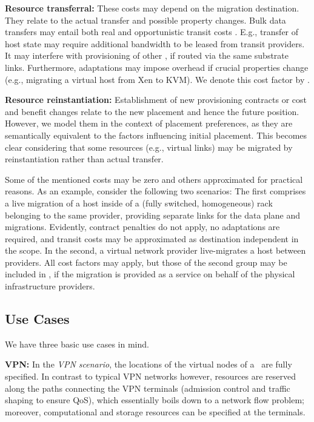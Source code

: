 \documentclass[conference,10pt]{IEEEtran}
\newcommand{\CloudNet}{\text{CloudNet}}
\newcommand{\CloudNets}{\text{CloudNets}}
\begin{document}
\noindent \textbf{Resource transferral:} These costs may depend on the migration destination. They relate to the actual transfer and possible property changes.
		Bulk data transfers may entail both real and opportunistic transit costs .
		E.g., transfer of host state may require additional bandwidth to be leased from transit providers. It may interfere with provisioning of other \CloudNets, if routed via the same substrate links.
		Furthermore, adaptations may impose overhead if crucial properties change (e.g., migrating a virtual host from Xen to KVM). We denote this cost factor by .

\noindent \textbf{Resource reinstantiation:} Establishment of new provisioning contracts or cost and benefit changes relate to the new placement and hence the future position.
		However, we model them in the context of placement preferences, as they are semantically equivalent to the factors influencing initial placement.
		This becomes clear considering that some resources (e.g., virtual links) may be migrated by reinstantiation rather than actual transfer.

Some of the mentioned costs may be zero and others approximated for practical reasons. As an example, consider the following two scenarios:
The first comprises a live migration of a host inside of a (fully switched, homogeneous) rack belonging to the same provider, providing separate links for the data plane and migrations. Evidently, contract penalties do not apply, no adaptations are required, and transit costs may be approximated as destination independent in the scope.
In the second, a virtual network provider live-migrates a host between providers. All cost factors may apply, but those of the second group may be included in , if the migration is provided as a service on behalf of the physical infrastructure providers.

\subsection{Use Cases}

We have three basic use cases in mind.

\noindent \textbf{VPN:} In the \emph{VPN scenario}, the locations of the virtual nodes
of a \CloudNet\ are fully specified. In contrast to typical VPN
networks however, resources are reserved along the paths connecting
the VPN terminals (admission control and traffic shaping to ensure
QoS), which essentially boils down to a network flow problem;
moreover, computational and storage resources can be specified at
the terminals.
\end{document}
